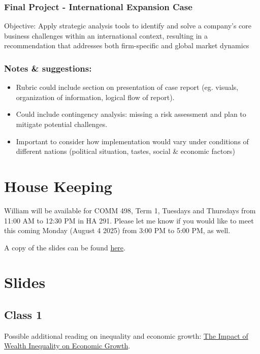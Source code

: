 \documentclass[
  11pt,
]{article}
\providecommand{\tightlist}{%
  \setlength{\itemsep}{0pt}\setlength{\parskip}{0pt}}
\begin{document}
\subsubsection{Final Project - International Expansion
Case}\label{final-project---international-expansion-case}

Objective: Apply strategic analysis tools to identify and solve a
company's core business challenges within an international context,
resulting in a recommendation that addresses both firm-specific and
global market dynamics

\subsubsection{Notes \& suggestions:}\label{notes-suggestions}

\begin{itemize}
\tightlist
\item
  Rubric could include section on presentation of case report (eg.
  visuals, organization of information, logical flow of report).
\item
  Could include contingency analysis: missing a risk assessment and plan
  to mitigate potential challenges.
\item
  Important to consider how implementation would vary under conditions
  of different nations (political situation, tastes, social \& economic
  factors)
\end{itemize}

\section{House Keeping}\label{house-keeping}

William will be available for COMM 498, Term 1, Tuesdays and Thursdays
from 11:00 AM to 12:30 PM in HA 291. Please let me know if you would
like to meet this coming Monday (August 4 2025) from 3:00 PM to 5:00 PM,
as well.

A copy of the slides can be found
\href{https://drive.google.com/drive/folders/1mERxpYGLjzyM1umdXgnxXbv5GSljAkrd?usp=sharing}{here}.

\section{Slides}\label{slides}

\subsection{Class 1}\label{class-1}

Possible additional reading on inequality and economic growth:
\href{https://cepr.org/voxeu/columns/impact-wealth-inequality-economic-growth-evidence-italy-during-its-structural}{The
Impact of Wealth Inequality on Economic Growth}.


\printbibliography
\end{document}
